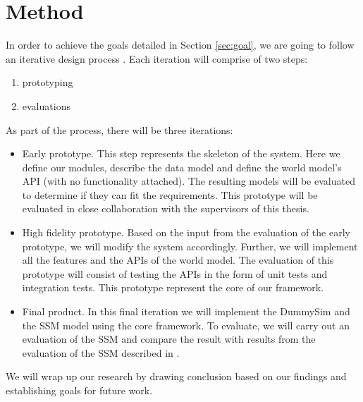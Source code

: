 \section{Method} %
\label{sec:method}

In order to achieve the goals detailed in Section \ref{sec:goal}, we are going to follow an iterative design process \cite{mackay1997hci}. Each iteration will comprise of two steps:
\begin{enumerate}
	\item prototyping
	\item evaluations
\end{enumerate}

As part of the process, there will be three iterations:
\begin{itemize}
	\item Early prototype. This step represents the skeleton of the system. Here we define our modules, describe the data model and define the world model's API (with no functionality attached). The resulting models will be evaluated to determine if they can fit the requirements. This prototype will be evaluated in close collaboration with the supervisors of this thesis.
	\item High fidelity prototype. Based on the input from the evaluation of the early prototype, we will modify the system accordingly. Further, we will implement all the features and the APIs of the world model. The evaluation of this prototype will consist of testing the APIs in the form of unit tests and integration tests. This prototype represent the core of our framework.
	\item Final product. In this final iteration we will implement the DummySim and the SSM model using the core framework. To evaluate, we will carry out an evaluation of the SSM and compare the result with results from the evaluation of the SSM described in \cite{pederson2011situative}.
\end{itemize}

We will wrap up our research by drawing conclusion based on our findings and establishing goals for future work.

